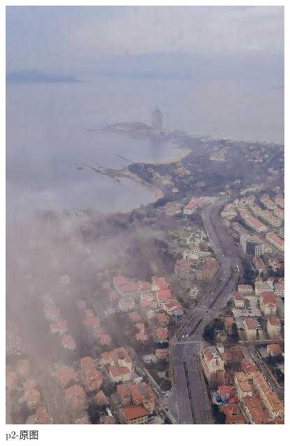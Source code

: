 \documentclass[12pt]{article}
\begin{document}
 \begin{figure}[!h]
    \centering
    \begin{minipage}[t]{0.24\linewidth}
        \centering
        \includegraphics[width=0.9\linewidth]{sample_pictures/p2.jpg}
        \caption*{p2-原图}
    \end{minipage}
    \begin{minipage}[t]{0.24\linewidth}
        \centering

\end{minipage}
\end{figure}
\end{document}
